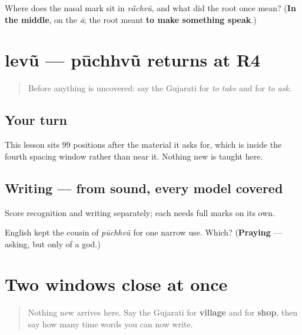 \begin{tcolorbox}[breakable,colback=teal!4,colframe=teal!35!black,title={Before you move on}]
Where does the nasal mark sit in \emph{vā̃chvũ}, and what did the root once mean? (\textbf{In the middle}, on the \emph{ā}; the root meant \textbf{to make something speak}.)
\end{tcolorbox}
\section[Practice]{levũ — pūchhvũ returns at R4}

\label{lesson:GU-R26-levun-puchhvun-r4}



\begin{quote}
Before anything is uncovered: say the Gujarati for \emph{to take} and for \emph{to ask}.
\end{quote}

\subsection*{Your turn}
This lesson sits 99 positions after the material it asks for, which is inside the fourth spacing window rather than near it. Nothing new is taught here.

\subsection*{Writing — from sound, every model covered}
Score recognition and writing separately; each needs full marks on its own.

\begin{tcolorbox}[breakable,colback=teal!4,colframe=teal!35!black,title={Before you move on}]
English kept the cousin of \emph{pūchhvũ} for one narrow use. Which? (\textbf{Praying} — asking, but only of a god.)
\end{tcolorbox}
\section[Practice]{Two windows close at once}

\label{lesson:GU-R26-time-written-r2}



\begin{quote}
Nothing new arrives here. Say the Gujarati for \textbf{village} and for \textbf{shop}, then say how many time words you can now write.
\end{quote}

